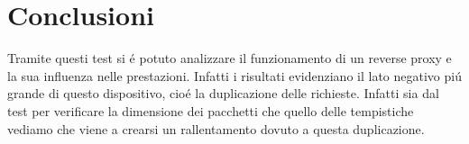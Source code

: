\section{Conclusioni}
Tramite questi test si é potuto analizzare il funzionamento di un reverse proxy e la sua influenza nelle prestazioni. Infatti i risultati evidenziano il lato negativo piú grande di questo dispositivo, cioé la duplicazione delle richieste. Infatti sia dal test per verificare la dimensione dei pacchetti che quello delle tempistiche vediamo che viene a crearsi un rallentamento dovuto a questa duplicazione.
